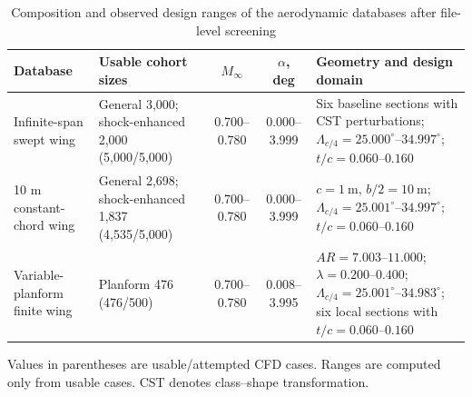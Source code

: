 \begin{table}[hbt!]
  \caption{Composition and observed design ranges of the aerodynamic databases after file-level screening}
  \label{tab:dataset-summary}
  \centering
  \scriptsize
  \setlength{\tabcolsep}{2.5pt}
  \renewcommand{\arraystretch}{1.12}
  \begin{tabularx}{\textwidth}{@{}p{}p{}ccp{}@{}}
    \hline\hline
    Database & Usable cohort sizes & $M_\infty$ & $\alpha$, deg & Geometry and design domain \\
    \hline
    Infinite-span swept wing & General 3,000; shock-enhanced 2,000 (5,000/5,000) & 0.700--0.780 & 0.000--3.999 & Six baseline sections with CST perturbations; $\Lambda_{c/4}=25.000^\circ$--$34.997^\circ$; $t/c=0.060$--$0.160$ \\
    10 m constant-chord wing & General 2,698; shock-enhanced 1,837 (4,535/5,000) & 0.700--0.780 & 0.000--3.999 & $c=1\ \mathrm{m}$, $b/2=10\ \mathrm{m}$; $\Lambda_{c/4}=25.001^\circ$--$34.997^\circ$; $t/c=0.060$--$0.160$ \\
    Variable-planform finite wing & Planform 476 (476/500) & 0.700--0.780 & 0.008--3.995 & $AR=7.003$--$11.000$; $\lambda=0.200$--$0.400$; $\Lambda_{c/4}=25.001^\circ$--$34.983^\circ$; six local sections with $t/c=0.060$--$0.160$ \\
    \hline\hline
  \end{tabularx}
  \begin{minipage}{0.98\textwidth}
    \vspace{2pt}\scriptsize
    Values in parentheses are usable/attempted CFD cases. Ranges are computed only from usable cases. CST denotes class--shape transformation.
  \end{minipage}
\end{table}

